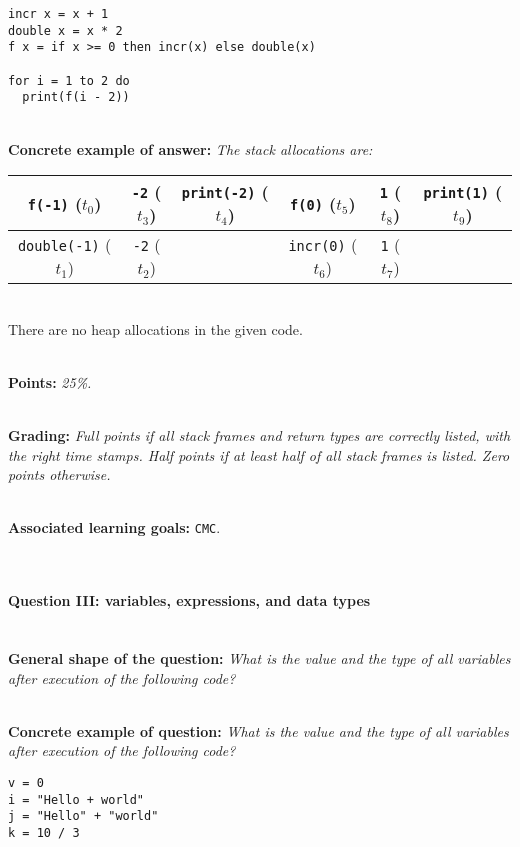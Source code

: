 \documentclass[12pt,a4paper,final]{article}
\begin{document}
\begin{lstlisting}
incr x = x + 1
double x = x * 2
f x = if x >= 0 then incr(x) else double(x)

for i = 1 to 2 do
  print(f(i - 2))
\end{lstlisting}

\ \\ 

\textbf{Concrete example of answer:} \textit{The stack allocations are:}

\begin{tabular}{| c | c | c | c | c | c |}
\hline
\texttt{f(-1)} ($t_0$) & \texttt{-2} ($t_3$) & \texttt{print(-2)} ($t_4$) & \texttt{f(0)} ($t_5$) & \texttt{1} ($t_8$) & \texttt{print(1)} ($t_9$) \\
\hline
\texttt{double(-1)} ($t_1$) & \texttt{-2} ($t_2$) & & \texttt{incr(0)} ($t_6$) & \texttt{1} ($t_7$) & \\
\hline
\end{tabular}

\ \\

There are no heap allocations in the given code.

\ \\

\textbf{Points:} \textit{25\%.}

\ \\ 

\textbf{Grading:} \textit{Full points if all stack frames and return types are correctly listed, with the right time stamps. Half points if at least half of all stack frames is listed. Zero points otherwise.}

\ \\ 

\textbf{Associated learning goals:} \texttt{CMC}.

\ \\ 

\paragraph{Question III: variables, expressions, and data types}

\ \\ 

\textbf{General shape of the question:} \textit{What is the value and the type of all variables after execution of the following code?}

\ \\ 

\textbf{Concrete example of question:} \textit{What is the value and the type of all variables after execution of the following code?}
\begin{lstlisting}
v = 0
i = "Hello + world"
j = "Hello" + "world"
k = 10 / 3
\end{lstlisting}
\end{document}
